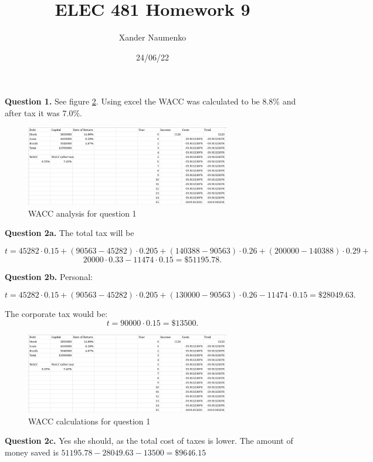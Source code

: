 \documentclass[letterpaper, reqno,11pt]{article}
\begin{document}
\title{ELEC 481 Homework 9}
\date{24/06/22}
\author{Xander Naumenko}
\maketitle

{\noindent\bf Question 1.} See figure \ref{fig:q1}. Using excel the WACC was calculated to be 8.8\% and after tax it was 7.0\%. 

\begin{figure}[htpb]
    \centering
    \includegraphics[width=0.8\textwidth]{q1}
    \caption{WACC analysis for question 1}
    \label{fig:q1}
\end{figure}

{\noindent\bf Question 2a.} The total tax will be 

\[
t=45282\cdot 0.15+(90563-45282)\cdot 0.205+(140388-90563)\cdot 0.26+(200000-140388)\cdot 0.29+
\]
\[
20000\cdot 0.33-11474\cdot 0.15=\$51195.78
.\]

{\noindent\bf Question 2b.} Personal: 

\[
t=45282\cdot 0.15+(90563-45282)\cdot 0.205+(130000-90563)\cdot 0.26-11474\cdot 0.15=\$28049.63
.\]

The corporate tax would be: 
\[
t=90000\cdot 0.15=\$13500
.\]

\begin{figure}[htpb]
    \centering
    \includegraphics[width=0.8\textwidth]{q1}
    \caption{WACC calculations for question 1}
    \label{fig:q1}
\end{figure}

{\noindent\bf Question 2c.} Yes she should, as the total cost of taxes is lower. The amount of money saved is $51195.78-28049.63-13500=\$9646.15$
\end{document}
